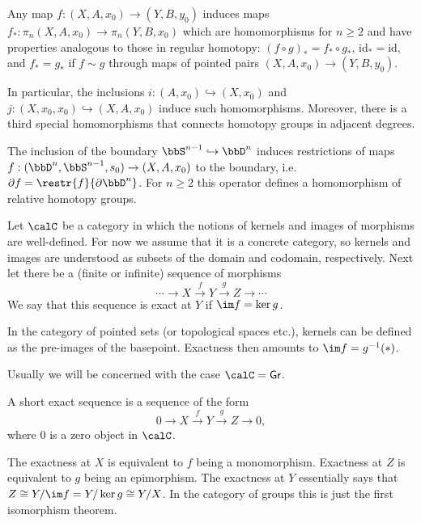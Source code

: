 Any map $f:(X,A,x_0)\to (Y,B,y_0)$ induces maps $f_\ast :\pi_n(X,A,x_0)\to \pi_n(Y,B,x_0)$ which are homomorphisms for $n\geq 2$ and have properties analogous to those in regular homotopy: $(f\circ g)_\ast=f_\ast\circ g_\ast$, $\mathrm{id}_\ast=\mathrm{id}$, and $f_\ast=g_\ast$ if $f\sim g$ through maps of pointed pairs $(X,A,x_0)\to(Y,B,y_0)$.

In particular, the inclusions $i:(A,x_0)\hookrightarrow(X,x_0)$ and $j:(X,x_0,x_0)\hookrightarrow (X,A,x_0)$ induce such homomorphisms. Moreover, there is a third special homomorphisms that connects homotopy groups in adjacent degrees.

\begin{defn}
    The inclusion of the boundary $\bbS^{n-1}\hookrightarrow \bbD^n$ induces restrictions of maps $f:(\bbD^n,\bbS^{n-1},s_0)\to (X,A,x_0)$ to the boundary, i.e.\ $\partial f=\restr{f}{\partial \bbD^n}$. For $n\geq 2$ this operator defines a homomorphism of relative homotopy groups.
\end{defn}

\begin{defn}
    Let $\calC$ be a category in which the notions of kernels and images of morphisms are well-defined. For now we assume that it is a concrete category, so kernels and images are understood as subsets of the domain and codomain, respectively. Next let there be a (finite or infinite) sequence of morphisms
    \[\cdots\to X\overset{f}{\to } Y\overset{g}{\to} Z\to \cdots \]
    We say that this sequence is exact at $Y$ if $\im f=\ker g$.
\end{defn}
\begin{example}
    In the category of pointed sets (or topological spaces etc.), kernels can be defined as the pre-images of the basepoint. Exactness then amounts to $\im f=g^{-1}(*)$.

    Usually we will be concerned with the case $\calC=\mathsf{Gr}$.
\end{example}
\begin{defn}
    A short exact sequence is a sequence of the form
    \[0\to X\overset{f}{\to } Y\overset{g}{\to} Z\to 0,\]
    where $0$ is a zero object in $\calC$.

    The exactness at $X$ is equivalent to $f$ being a monomorphism. Exactness at $Z$ is equivalent to $g$ being an epimorphism. The exactness at $Y$ essentially says that $Z\cong Y\slash \im f=Y\slash \ker g\cong Y\slash X$. In the category of groups this is just the first isomorphism theorem.
\end{defn}

